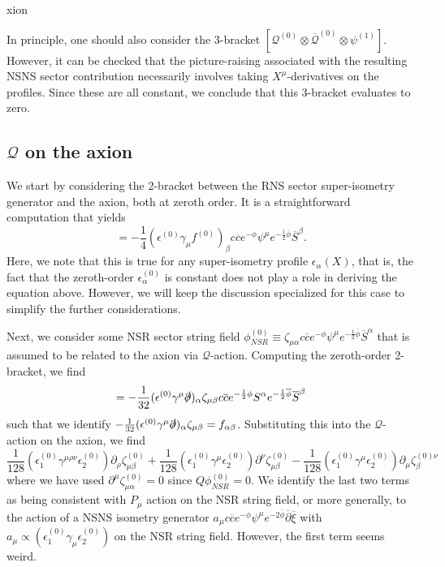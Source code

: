 xion\documentclass[12pt]{article}
\numberwithin{equation}{section}
\newcommand{\B}[1]{\overline{#1}}
\begin{document}
In principle, one should also consider the 3-bracket $[\mathcal{Q}^{(0)}\otimes\B{\mathcal{Q}}^{(0)}\otimes\psi^{(1)}]$. However, it can be checked that the picture-raising associated with the resulting NSNS sector contribution necessarily involves taking $X^{\mu}$-derivatives on the profiles. Since these are all constant, we conclude that this 3-bracket evaluates to zero.



\subsection{$\mathcal{Q}$ on the axion}
We start by considering the 2-bracket between the RNS sector super-isometry generator and the axion, both at zeroth order. It is a straightforward computation that yields
\begin{equation}
    [\lambda^{(0)}_{RNS}\otimes\phi_{axion}^{(0)}]=-\frac{1}{4}(\epsilon^{(0)}\gamma_{\mu}f^{(0)})_{\beta}c\B{c}e^{-\phi}\psi^{\mu}e^{-\frac{1}{2}\B{\phi}}\B{S}^\beta.
\end{equation}
Here, we note that this is true for any super-isometry profile $\epsilon_{\alpha}(X)$, that is, the fact that the zeroth-order $\epsilon_{\alpha}^{(0)}$ is constant does not play a role in deriving the equation above. However, we will keep the discussion specialized for this case to simplify the further considerations.

Next, we consider some NSR sector string field $\phi_{NSR}^{(0)}\equiv\zeta_{\mu\alpha}c\B{c}e^{-\phi}\psi^{\mu}e^{-\frac{1}{2}\B{\phi}}\B{S}^{\alpha}$ that is assumed to be related to the axion via $\mathcal{Q}$-action. Computing the zeroth-order 2-bracket, we find
\begin{equation}
    [\lambda_{RNS}^{(0)}\otimes\phi_{NSR}^{(0)}]=-\frac{1}{32}(\epsilon^{(0)}\gamma^{\mu}\slashed{\partial})_\alpha\zeta_{\mu\beta}c\B{c}e^{-\frac{1}{2}\phi}S^{\alpha}e^{-\frac{1}{2}\B{\phi}}\B{S}^{\beta}
\end{equation}
such that we identify $-\frac{1}{32}(\epsilon^{(0)}\gamma^{\mu}\slashed{\partial})_\alpha\zeta_{\mu\beta}=f_{\alpha\beta}$. Substituting this into the $\mathcal{Q}$-action on the axion, we find
\begin{equation}
    \frac{1}{128}(\epsilon_1^{(0)}\gamma^{\mu\rho\nu}\epsilon_2^{(0)})\partial_{\rho}\zeta_{\mu\beta}^{(0)}+\frac{1}{128}(\epsilon_1^{(0)}\gamma^{\mu}\epsilon_2^{(0)})\partial^{\nu}\zeta_{\mu\beta}^{(0)}-\frac{1}{128}(\epsilon_1^{(0)}\gamma^{\mu}\epsilon_2^{(0)})\partial_{\mu}\zeta^{(0)\nu}_{\beta}
\end{equation}
where we have used $\partial^{\mu}\zeta_{\mu\alpha}^{(0)}=0$ since $Q\phi_{NSR}^{(0)}=0$. We identify the last two terms as being consistent with $P_{\mu}$ action on the NSR string field, or more generally, to the action of a NSNS isometry generator $a_{\mu}c\B{c}e^{-\phi}\psi^{\mu}e^{-2\B{\phi}}\B{\partial}\B{\xi}$ with $a_{\mu}\propto(\epsilon_1^{(0)}\gamma_{\mu}\epsilon_2^{(0)})$ on the NSR string field. However, the first term seems weird.
\end{document}
